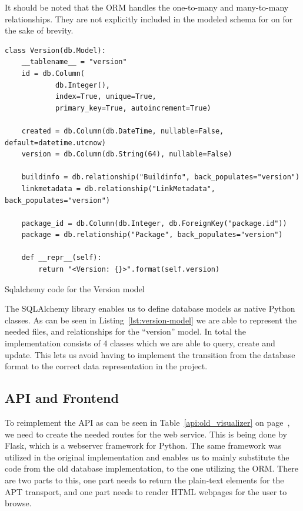 \documentclass[../Main/thesis.tex]{subfiles}
\begin{document}
It should be noted that the ORM handles the one-to-many and many-to-many
relationships. They are not explicitly included in the modeled schema for on 
for the sake of brevity.

\begin{listing}[H]
\begin{verbatim}
class Version(db.Model):
    __tablename__ = "version"
    id = db.Column(
            db.Integer(),
            index=True, unique=True, 
            primary_key=True, autoincrement=True)

    created = db.Column(db.DateTime, nullable=False, default=datetime.utcnow)
    version = db.Column(db.String(64), nullable=False)

    buildinfo = db.relationship("Buildinfo", back_populates="version")
    linkmetadata = db.relationship("LinkMetadata", back_populates="version")

    package_id = db.Column(db.Integer, db.ForeignKey("package.id"))
    package = db.relationship("Package", back_populates="version")

    def __repr__(self):
        return "<Version: {}>".format(self.version)
\end{verbatim}
\caption{Sqlalchemy code for the Version model}
\label{lst:version-model}
\end{listing}

The SQLAlchemy library enables us to define database models as native Python
classes. As can be seen in Listing~\ref{lst:version-model} we are able to
represent the needed files, and relationships for the ``version'' model. In
total the implementation consists of 4 classes which we are able to query,
create and update. This lets us avoid having to implement the transition from
the database format to the correct data representation in the project.

\subsection*{API and Frontend}%
\label{sub:api_and_frontend}

To reimplement the API as can be seen in Table~\ref{api:old_visualizer} on
page~\pageref{api:old_visualizer}, we need to create the needed routes for the
web service. This is being done by Flask, which is a webserver framework for
Python. The same framework was utilized in the original implementation and
enables us to mainly substitute the code from the old database implementation,
to the one utilizing the ORM. There are two parts to this, one part needs to
return the plain-text elements for the APT transport, and one part needs to
render HTML webpages for the user to browse.
\end{document}
